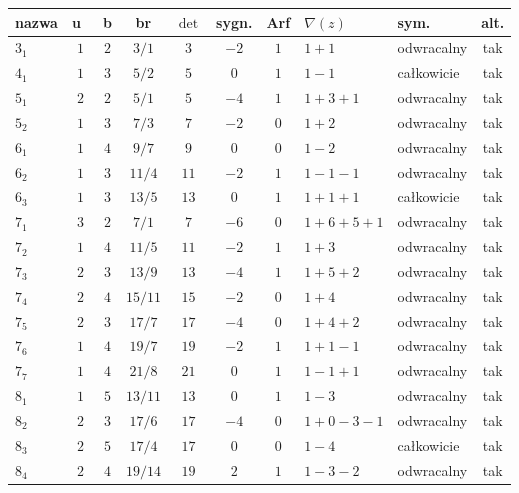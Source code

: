 \renewcommand*{\arraystretch}{1.4}
\footnotesize
\begin{longtable}{lccccccllc}
\hline
nazwa & u~& b & br & $\det$ & sygn. & Arf & $\nabla(z)$ & sym. & alt. \\ \hline
\endhead %
$3_{1}$    & $1$   & $2$ & $3/1$ & $3$   & $-2$ & $1$ & $1+1$         & odwracalny & tak \\
$4_{1}$    & $1$   & $3$ & $5/2$ & $5$   & $0$  & $1$ & $1-1$         & całkowicie & tak \\
$5_{1}$    & $2$   & $2$ & $5/1$ & $5$   & $-4$ & $1$ & $1+3+1$       & odwracalny & tak \\
$5_{2}$    & $1$   & $3$ & $7/3$ & $7$   & $-2$ & $0$ & $1+2$         & odwracalny & tak \\
$6_{1}$    & $1$   & $4$ & $9/7$ & $9$   & $0$  & $0$ & $1-2$         & odwracalny & tak \\
$6_{2}$    & $1$   & $3$ & $11/4$ & $11$  & $-2$ & $1$ & $1-1-1$       & odwracalny & tak \\
$6_{3}$    & $1$   & $3$ & $13/5$ & $13$  & $0$  & $1$ & $1+1+1$       & całkowicie & tak \\
$7_{1}$    & $3$   & $2$ & $7/1$ & $7$   & $-6$ & $0$ & $1+6+5+1$     & odwracalny & tak \\
$7_{2}$    & $1$   & $4$ & $11/5$ & $11$  & $-2$ & $1$ & $1+3$         & odwracalny & tak \\
$7_{3}$    & $2$   & $3$ & $13/9$ & $13$  & $-4$ & $1$ & $1+5+2$       & odwracalny & tak \\
$7_{4}$    & $2$   & $4$ & $15/11$ & $15$  & $-2$ & $0$ & $1+4$         & odwracalny & tak \\
$7_{5}$    & $2$   & $3$ & $17/7$ & $17$  & $-4$ & $0$ & $1+4+2$       & odwracalny & tak \\
$7_{6}$    & $1$   & $4$ & $19/7$ & $19$  & $-2$ & $1$ & $1+1-1$       & odwracalny & tak \\
$7_{7}$    & $1$   & $4$ & $21/8$ & $21$  & $0$  & $1$ & $1-1+1$       & odwracalny & tak \\
$8_{1}$    & $1$   & $5$ & $13/11$ & $13$  & $0$  & $1$ & $1-3$         & odwracalny & tak \\
$8_{2}$    & $2$   & $3$ & $17/6$ & $17$  & $-4$ & $0$ & $1+0-3-1$     & odwracalny & tak \\
$8_{3}$    & $2$   & $5$ & $17/4$ & $17$  & $0$  & $0$ & $1-4$         & całkowicie & tak \\
$8_{4}$    & $2$   & $4$ & $19/14$ & $19$  & $2$  & $1$ & $1-3-2$       & odwracalny & tak \\

\end{longtable}
